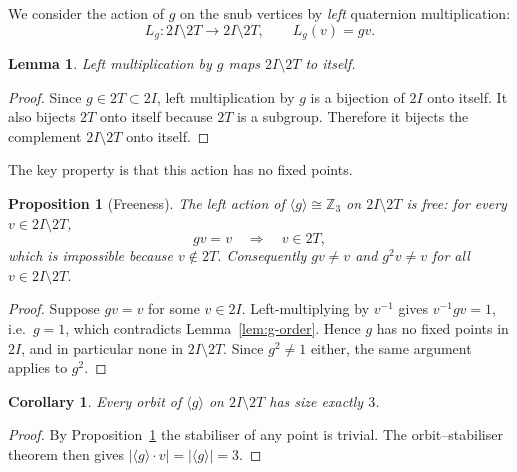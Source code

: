 \documentclass[10pt,reqno]{amsart}
\theoremstyle{plain}
\newtheorem{lemma}[theorem]{Lemma}
\newtheorem{proposition}[theorem]{Proposition}
\newtheorem{corollary}[theorem]{Corollary}
\theoremstyle{definition}
\begin{document}
We consider the action of $g$ on the snub vertices by \emph{left} quaternion multiplication:
\begin{equation}
L_g : 2I \setminus 2T \longrightarrow 2I \setminus 2T, \qquad L_g(v) = g v.
\end{equation}

\begin{lemma}\label{lem:action-preserves}
Left multiplication by $g$ maps $2I \setminus 2T$ to itself.
\end{lemma}

\begin{proof}
Since $g \in 2T \subset 2I$, left multiplication by $g$ is a bijection of $2I$ onto itself. It also bijects $2T$ onto itself because $2T$ is a subgroup. Therefore it bijects the complement $2I \setminus 2T$ onto itself.
\end{proof}

The key property is that this action has no fixed points.

\begin{proposition}[Freeness]\label{prop:free}
The left action of $\langle g \rangle \cong \mathbb{Z}_3$ on $2I \setminus 2T$ is free: for every $v \in 2I \setminus 2T$,
\begin{equation}
g v = v \quad\Longrightarrow\quad v \in 2T,
\end{equation}
which is impossible because $v \notin 2T$. Consequently $g v \neq v$ and $g^2 v \neq v$ for all $v \in 2I \setminus 2T$.
\end{proposition}

\begin{proof}
Suppose $g v = v$ for some $v \in 2I$. Left-multiplying by $v^{-1}$ gives $v^{-1} g v = 1$, i.e.\ $g=1$, which contradicts Lemma~\ref{lem:g-order}. Hence $g$ has no fixed points in $2I$, and in particular none in $2I \setminus 2T$. Since $g^2 \neq 1$ either, the same argument applies to $g^2$.
\end{proof}

\begin{corollary}
Every orbit of $\langle g \rangle$ on $2I \setminus 2T$ has size exactly $3$.
\end{corollary}

\begin{proof}
By Proposition~\ref{prop:free} the stabiliser of any point is trivial. The orbit--stabiliser theorem then gives $|\langle g \rangle \cdot v| = |\langle g \rangle| = 3$.
\end{proof}
\end{document}

